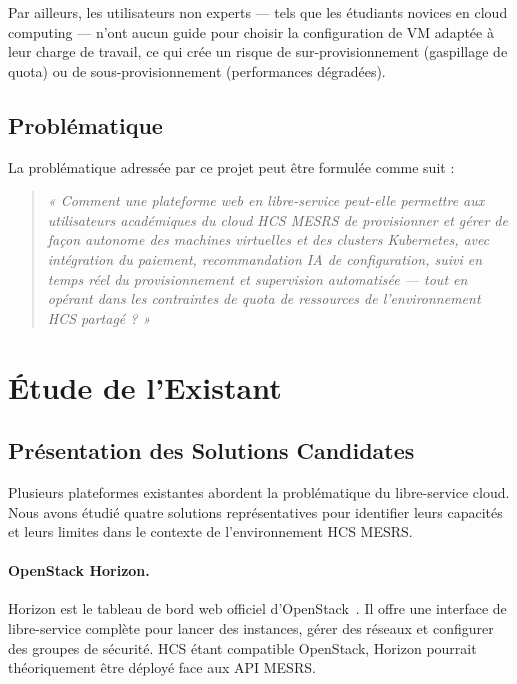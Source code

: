 Par ailleurs, les utilisateurs non experts --- tels que les étudiants novices en
cloud computing --- n'ont aucun guide pour choisir la configuration de VM adaptée
à leur charge de travail, ce qui crée un risque de sur-provisionnement (gaspillage de
quota) ou de sous-provisionnement (performances dégradées).

\subsection{Problématique}

La problématique adressée par ce projet peut être formulée comme suit :

\begin{quote}
\textit{« Comment une plateforme web en libre-service peut-elle permettre aux
utilisateurs académiques du cloud HCS MESRS de provisionner et gérer de façon
autonome des machines virtuelles et des clusters Kubernetes, avec intégration du
paiement, recommandation IA de configuration, suivi en temps réel du provisionnement
et supervision automatisée --- tout en opérant dans les contraintes de quota de
ressources de l'environnement HCS partagé ? »}
\end{quote}

\section{Étude de l'Existant}

\subsection{Présentation des Solutions Candidates}

Plusieurs plateformes existantes abordent la problématique du libre-service cloud.
Nous avons étudié quatre solutions représentatives pour identifier leurs capacités
et leurs limites dans le contexte de l'environnement HCS MESRS.

\paragraph{OpenStack Horizon.}
Horizon est le tableau de bord web officiel d'OpenStack~\cite{horizon_docs}.
Il offre une interface de libre-service complète pour lancer des instances, gérer des
réseaux et configurer des groupes de sécurité. HCS étant compatible OpenStack, Horizon
pourrait théoriquement être déployé face aux API MESRS.

